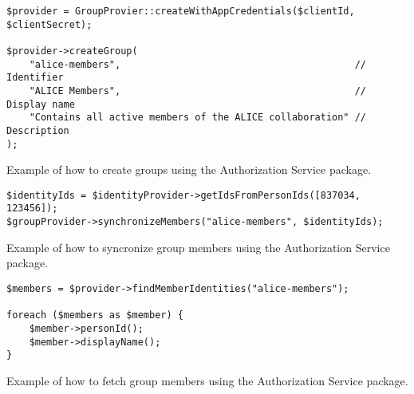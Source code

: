 \begin{listing}[htbp]
\begin{verbatim}
$provider = GroupProvier::createWithAppCredentials($clientId, $clientSecret);

$provider->createGroup(
	"alice-members",                                         // Identifier
	"ALICE Members",                                         // Display name
	"Contains all active members of the ALICE collaboration" // Description
);
\end{verbatim}
\caption{Example of how to create groups using the Authorization Service package.}
\label{code:create-groups}
\end{listing}

\begin{listing}[htbp]
\begin{verbatim}
$identityIds = $identityProvider->getIdsFromPersonIds([837034, 123456]);
$groupProvider->synchronizeMembers("alice-members", $identityIds);
\end{verbatim}
\caption{Example of how to syncronize group members using the Authorization Service package.}
\label{code:sync-groups}
\end{listing}

\begin{listing}[htbp]
\begin{verbatim}
$members = $provider->findMemberIdentities("alice-members");

foreach ($members as $member) {
	$member->personId();
	$member->displayName();
}
\end{verbatim}
\caption{Example of how to fetch group members using the Authorization Service package.}
\label{code:fetch-group-members}
\end{listing}
